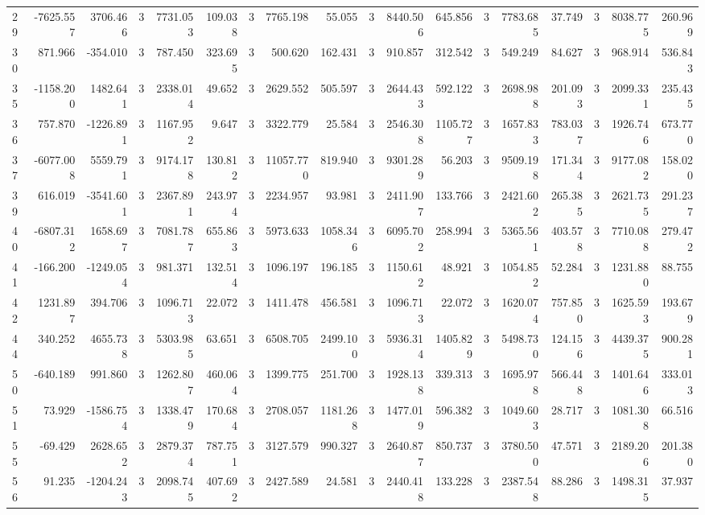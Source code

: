 \begin{table}[ht]
\begin{tabular}{lrrrrrrrrrrrrrrrrr}
29 & -7625.557 & 3706.466 & 3 & 7731.053 & 109.038 & 3 & 7765.198 & 55.055 & 3 & 8440.506 & 645.856 & 3 & 7783.685 & 37.749 & 3 & 8038.775 & 260.969 \\
30 & 871.966 & -354.010 & 3 & 787.450 & 323.695 & 3 & 500.620 & 162.431 & 3 & 910.857 & 312.542 & 3 & 549.249 & 84.627 & 3 & 968.914 & 536.843 \\
35 & -1158.200 & 1482.641 & 3 & 2338.014 & 49.652 & 3 & 2629.552 & 505.597 & 3 & 2644.433 & 592.122 & 3 & 2698.988 & 201.093 & 3 & 2099.331 & 235.435 \\
36 & 757.870 & -1226.891 & 3 & 1167.952 & 9.647 & 3 & 3322.779 & 25.584 & 3 & 2546.308 & 1105.727 & 3 & 1657.833 & 783.037 & 3 & 1926.746 & 673.770 \\
37 & -6077.008 & 5559.791 & 3 & 9174.178 & 130.812 & 3 & 11057.770 & 819.940 & 3 & 9301.289 & 56.203 & 3 & 9509.198 & 171.344 & 3 & 9177.082 & 158.020 \\
39 & 616.019 & -3541.601 & 3 & 2367.891 & 243.974 & 3 & 2234.957 & 93.981 & 3 & 2411.907 & 133.766 & 3 & 2421.602 & 265.385 & 3 & 2621.735 & 291.237 \\
40 & -6807.312 & 1658.697 & 3 & 7081.787 & 655.863 & 3 & 5973.633 & 1058.346 & 3 & 6095.702 & 258.994 & 3 & 5365.561 & 403.578 & 3 & 7710.088 & 279.472 \\
41 & -166.200 & -1249.054 & 3 & 981.371 & 132.514 & 3 & 1096.197 & 196.185 & 3 & 1150.612 & 48.921 & 3 & 1054.852 & 52.284 & 3 & 1231.880 & 88.755 \\
42 & 1231.897 & 394.706 & 3 & 1096.713 & 22.072 & 3 & 1411.478 & 456.581 & 3 & 1096.713 & 22.072 & 3 & 1620.074 & 757.850 & 3 & 1625.593 & 193.679 \\
44 & 340.252 & 4655.738 & 3 & 5303.985 & 63.651 & 3 & 6508.705 & 2499.100 & 3 & 5936.314 & 1405.829 & 3 & 5498.730 & 124.156 & 3 & 4439.375 & 900.281 \\
50 & -640.189 & 991.860 & 3 & 1262.807 & 460.064 & 3 & 1399.775 & 251.700 & 3 & 1928.138 & 339.313 & 3 & 1695.978 & 566.448 & 3 & 1401.646 & 333.013 \\
51 & 73.929 & -1586.754 & 3 & 1338.479 & 170.684 & 3 & 2708.057 & 1181.268 & 3 & 1477.019 & 596.382 & 3 & 1049.603 & 28.717 & 3 & 1081.308 & 66.516 \\
55 & -69.429 & 2628.652 & 3 & 2879.374 & 787.751 & 3 & 3127.579 & 990.327 & 3 & 2640.877 & 850.737 & 3 & 3780.500 & 47.571 & 3 & 2189.206 & 201.380 \\
56 & 91.235 & -1204.243 & 3 & 2098.745 & 407.692 & 3 & 2427.589 & 24.581 & 3 & 2440.418 & 133.228 & 3 & 2387.548 & 88.286 & 3 & 1498.315 & 37.937 \\

\end{tabular}
\end{table}
